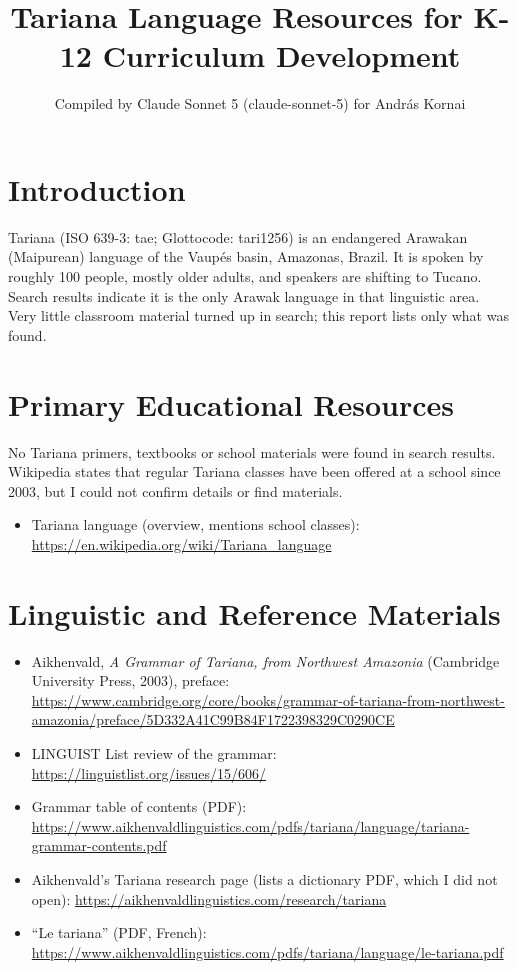 \documentclass[12pt]{article}
\title{Tariana Language Resources for K-12 Curriculum Development}
\author{Compiled by Claude Sonnet 5 (claude-sonnet-5) for Andr\'as Kornai}
\date{}
\begin{document}
\maketitle

\section{Introduction}
Tariana (ISO 639-3: tae; Glottocode: tari1256) is an endangered Arawakan (Maipurean) language of the Vaup\'es basin, Amazonas, Brazil. It is spoken by roughly 100 people, mostly older adults, and speakers are shifting to Tucano. Search results indicate it is the only Arawak language in that linguistic area. Very little classroom material turned up in search; this report lists only what was found.

\section{Primary Educational Resources}
No Tariana primers, textbooks or school materials were found in search results. Wikipedia states that regular Tariana classes have been offered at a school since 2003, but I could not confirm details or find materials.
\begin{itemize}
\item Tariana language (overview, mentions school classes): \url{https://en.wikipedia.org/wiki/Tariana_language}
\end{itemize}

\section{Linguistic and Reference Materials}
\begin{itemize}
\item Aikhenvald, \emph{A Grammar of Tariana, from Northwest Amazonia} (Cambridge University Press, 2003), preface: \url{https://www.cambridge.org/core/books/grammar-of-tariana-from-northwest-amazonia/preface/5D332A41C99B84F1722398329C0290CE}
\item LINGUIST List review of the grammar: \url{https://linguistlist.org/issues/15/606/}
\item Grammar table of contents (PDF): \url{https://www.aikhenvaldlinguistics.com/pdfs/tariana/language/tariana-grammar-contents.pdf}
\item Aikhenvald's Tariana research page (lists a dictionary PDF, which I did not open): \url{https://aikhenvaldlinguistics.com/research/tariana}
\item ``Le tariana'' (PDF, French): \url{https://www.aikhenvaldlinguistics.com/pdfs/tariana/language/le-tariana.pdf}
\end{itemize}
\end{document}
